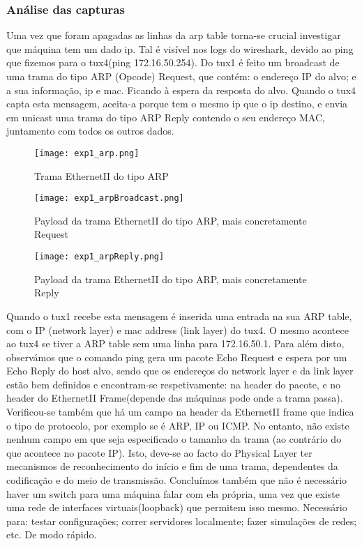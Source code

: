 \documentclass[a4paper]{article}
\begin{document}
\subsubsection{Análise das capturas}
Uma vez que foram apagadas as linhas da arp table torna-se crucial investigar
que máquina tem um dado ip. Tal é visível nos logs do wireshark, devido ao ping
que fizemos para o tux4(ping 172.16.50.254). Do tux1 é feito um broadcast de
uma trama do tipo ARP (Opcode) Request, que contém: o endereço IP do alvo; e a
sua informação, ip e mac. Ficando à espera da resposta do alvo. Quando o tux4
capta esta mensagem, aceita-a porque tem o mesmo ip que o ip destino, e envia
em unicast uma trama do tipo ARP Reply contendo o seu endereço MAC, juntamento
com todos os outros dados.

\begin{figure}[h]
    \centering
    \texttt{[image: exp1\_arp.png]}
    \caption{Trama EthernetII do tipo ARP}
\end{figure}
\begin{figure}[h]
    \centering
    \texttt{[image: exp1\_arpBroadcast.png]}
    \caption{Payload da trama EthernetII do tipo ARP, mais concretamente Request}
\end{figure}
\begin{figure}[h]
    \centering
    \texttt{[image: exp1\_arpReply.png]}
    \caption{Payload da trama EthernetII do tipo ARP, mais concretamente Reply}
\end{figure}

Quando o tux1 recebe esta mensagem é inserida uma entrada na sua ARP table, com
o IP (network layer) e mac address (link layer) do tux4. O mesmo acontece ao
tux4 se tiver a ARP table sem uma linha para 172.16.50.1. Para além disto,
observámos que o comando ping gera um pacote Echo Request e espera por um Echo
Reply do host alvo, sendo que os endereços do network layer e da link layer
estão bem definidos e encontram-se respetivamente: na header do pacote, e no
header do EthernetII Frame(depende das máquinas pode onde a trama passa).
Verificou-se também que há um campo na header da EthernetII frame que indica o
tipo de protocolo, por exemplo se é ARP, IP ou ICMP. No entanto, não existe
nenhum campo em que seja especificado o tamanho da trama (ao contrário do que
acontece no pacote IP). Isto, deve-se ao facto do Physical Layer ter mecanismos
de reconhecimento do início e fim de uma trama, dependentes da codificação e do
meio de transmissão. Concluímos também que não é necessário haver um switch
para uma máquina falar com ela própria, uma vez que existe uma rede de
interfaces virtuais(loopback) que permitem isso mesmo. Necessário para: testar
configurações; correr servidores localmente; fazer simulações de redes; etc. De
modo rápido.
\end{document}
